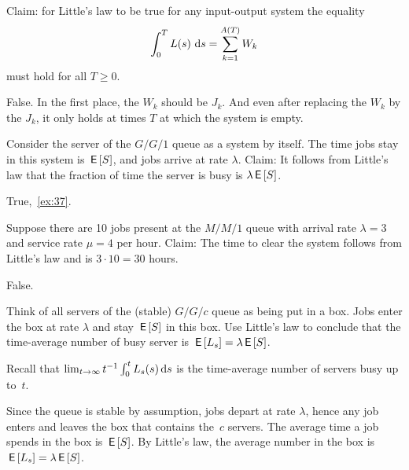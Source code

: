 \documentclass[stochastic-or.tex]{subfiles}
\begin{document}
\begin{truefalse}
Claim: for Little's law to be true for any input-output system the equality
\begin{equation*}
 \int_0^T L(s)\, \,\textrm{d}s = \sum_{k=1}^{A(T)} W_k
\end{equation*}
must hold for  all $T\geq 0$.
\begin{solution}
False. In the first place, the $W_{k}$ should be $J_{k}$.  And even after replacing the $W_{k}$ by the $J_{k}$, it only holds at times $T$ at which the system is empty.
\end{solution}
\end{truefalse}

\begin{truefalse}
Consider the server of the $G/G/1$ queue as a system by itself.
The time jobs stay in this system is $\,\mathsf{E}\left[S\right]$, and jobs arrive at rate $\lambda$.
Claim: It follows from Little's law that the fraction of time the server is busy is $\lambda \,\mathsf{E}\left[S\right]$.
\begin{solution} True,~\cref{ex:37}.
\end{solution}
\end{truefalse}

\begin{truefalse}
 Suppose there are 10 jobs present at the $M/M/1$ queue with arrival rate $\lambda=3$ and service rate $\mu=4$ per hour.
Claim:  The time to clear the system follows from Little's law and is $3\cdot 10 = 30$ hours.
\begin{solution}
False.
\end{solution}
\end{truefalse}

\begin{exercise}\label{ex:37}
Think of all servers of the (stable) $G/G/c$ queue as being put in a box.
Jobs enter the box at rate $\lambda$ and stay $\,\mathsf{E}\left[S\right]$ in this box.
Use Little's law to conclude that the time-average number of busy server is $\,\mathsf{E}\left[L_s\right] = \lambda \,\mathsf{E}\left[S\right]$.
\begin{hint}
Recall that $\lim_{t\to\infty} t^{-1}\int_0^t L_s(s)\,\textrm{d}s$ is the time-average number of servers busy up to~$t$.
\end{hint}
\begin{solution}
Since the queue is stable by assumption, jobs depart at rate $\lambda$, hence any job enters and leaves the box that contains the~$c$ servers.
The average time a job spends in the box is $\,\mathsf{E}\left[S\right]$.
By Little's law, the average number in the box is $\,\mathsf{E}\left[L_s\right] = \lambda \,\mathsf{E}\left[S\right]$.
\end{solution}
\end{exercise}
\end{document}

